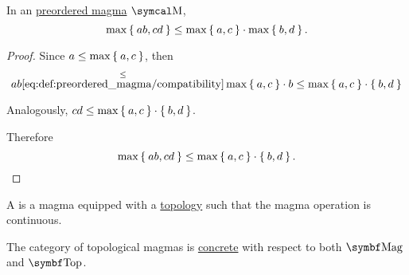 \begin{proposition}\label{thm:preordered_magma_max_distributivity}
  In an \hyperref[def:preordered_magma]{preordered magma} \( \CM \),
  \begin{equation}\label{eq:thm:preordered_magma_max_distributivity}
    \max \Set{a b, c d} \leq \max \Set{a, c} \cdot \max \Set{b, d}.
  \end{equation}
\end{proposition}
\begin{proof}
  Since \( a \leq \max \Set{a, c} \), then
  \begin{equation*}
    ab
    \overset \leq {\eqref{eq:def:preordered_magma/compatibility}}
    \max \Set{a, c} \cdot b
    \leq
    \max \Set{a, c} \cdot \Set{b, d}
  \end{equation*}

  Analogously, \( cd \leq \max \Set{a, c} \cdot \Set{b, d} \).

  Therefore
  \begin{equation}
    \max \Set{a b, c d} \leq \max \Set{a, c} \cdot \Set{b, d}.
  \end{equation}
\end{proof}

\begin{definition}\label{def:topological_magma}
  A  is a magma equipped with a \hyperref[def:topological_space]{topology} such that the magma operation is continuous.

  The category of topological magmas is \hyperref[def:concrete_category]{concrete} with respect to both \( \Cat{Mag} \) and \hyperref[def:category_of_topological_spaces]{\( \Cat{Top} \)}.
\end{definition}
